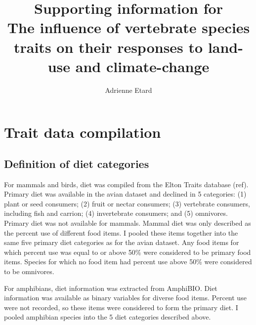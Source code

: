 \documentclass[11pt]{article}
\begin{document}
\title{\textbf{Supporting information for\\
\vspace{1cm}
The influence of vertebrate species traits on their responses to land-use and climate-change
\vspace{2cm}}}

\author{Adrienne Etard}

\maketitle

\clearpage
\tableofcontents


\clearpage
\listoftables

\clearpage
\listoffigures


\clearpage

\section{Trait data compilation}

\subsection{Definition of diet categories}
For mammals and birds, diet was compiled from the Elton Traits database (ref). Primary diet was available in the avian dataset and declined in 5 categories: (1) plant or seed consumers; (2) fruit or nectar consumers; (3) vertebrate consumers, including fish and carrion; (4) invertebrate consumers; and (5) omnivores. Primary diet was not available for mammals. Mammal diet was only described as the percent use of different food items. I pooled these items together into the same five primary diet categories as for the avian dataset. Any food items for which percent use was equal to or above 50\% were considered to be primary food items. Species for which no food item had percent use above 50\% were considered to be omnivores.

For amphibians, diet information was extracted from AmphiBIO. Diet information was available as binary variables for diverse food items. Percent use were not recorded, so these items were considered to form the primary diet. I pooled amphibian species into the 5 diet categories described above.
\end{document}
